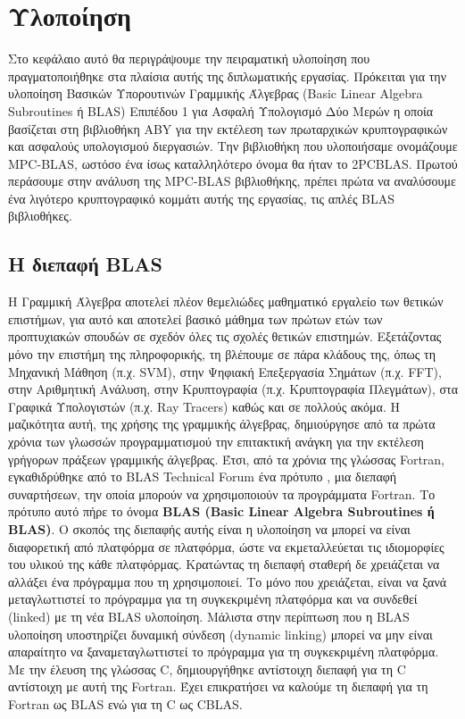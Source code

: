 \chapter{Υλοποίηση}
\label{chapter:implementation}

Στο κεφάλαιο αυτό θα περιγράψουμε την πειραματική υλοποίηση που πραγματοποιήθηκε στα πλαίσια αυτής της διπλωματικής εργασίας. Πρόκειται για την υλοποίηση Βασικών Υπορουτινών Γραμμικής Άλγεβρας (Basic Linear Algebra Subroutines ή BLAS) Επιπέδου 1 για Ασφαλή Υπολογισμό Δύο Μερών η οποία βασίζεται στη βιβλιοθήκη ABY για την εκτέλεση των πρωταρχικών κρυπτογραφικών και ασφαλούς υπολογισμού διεργασιών. Την βιβλιοθήκη που υλοποιήσαμε ονομάζουμε MPC-BLAS, ωστόσο ένα ίσως καταλληλότερο όνομα θα ήταν το 2PCBLAS. Πρωτού περάσουμε στην ανάλυση της MPC-BLAS βιβλιοθήκης, πρέπει πρώτα να αναλύσουμε ένα λιγότερο κρυπτογραφικό κομμάτι αυτής της εργασίας, τις απλές BLAS βιβλιοθήκες.


\section{Η διεπαφή BLAS}

Η Γραμμική Άλγεβρα αποτελεί πλέον θεμελιώδες μαθηματικό εργαλείο των θετικών επιστήμων, για αυτό και αποτελεί βασικό μάθημα των πρώτων ετών των προπτυχιακών σπουδών σε σχεδόν όλες τις σχολές θετικών επιστημών. Εξετάζοντας μόνο την επιστήμη της πληροφορικής, τη βλέπουμε σε πάρα κλάδους της, όπως τη Μηχανική Μάθηση (π.χ. SVM), στην Ψηφιακή Επεξεργασία Σημάτων (π.χ. FFT), στην Αριθμητική Ανάλυση, στην Κρυπτογραφία (π.χ. Κρυπτογραφία Πλεγμάτων), στα Γραφικά Υπολογιστών (π.χ. Ray Tracers) καθώς και σε πολλούς ακόμα.
Η μαζικότητα αυτή, της χρήσης της γραμμικής άλγεβρας, δημιούργησε από τα πρώτα χρόνια των γλωσσών προγραμματισμού την επιτακτική ανάγκη για την εκτέλεση γρήγορων πράξεων γραμμικής άλγεβρας. Έτσι, από τα χρόνια της γλώσσας Fortran, εγκαθιδρύθηκε από το BLAS Technical Forum ένα πρότυπο \cite{blackford2002updated}, μια διεπαφή συναρτήσεων, την οποία μπορούν να χρησιμοποιούν τα προγράμματα Fortran. Το πρότυπο αυτό πήρε το όνομα \textbf{BLAS (Basic Linear Algebra Subroutines ή BLAS)}. Ο σκοπός της διεπαφής αυτής είναι η υλοποίηση να μπορεί να είναι διαφορετική
από πλατφόρμα σε πλατφόρμα, ώστε να εκμεταλλεύεται τις ιδιομορφίες του υλικού της κάθε πλατφόρμας. Κρατώντας τη διεπαφή σταθερή δε χρειάζεται να αλλάξει ένα πρόγραμμα που τη χρησιμοποιεί. Το μόνο που χρειάζεται, είναι να ξανά μεταγλωττιστεί το πρόγραμμα για τη συγκεκριμένη πλατφόρμα και να συνδεθεί (linked) με τη νέα BLAS υλοποίηση. Μάλιστα στην περίπτωση που η BLAS υλοποίηση υποστηρίζει δυναμική σύνδεση (dynamic linking) μπορεί να μην είναι απαραίτητο να ξαναμεταγλωττιστεί το πρόγραμμα για τη συγκεκριμένη πλατφόρμα. Με την έλευση της γλώσσας C, δημιουργήθηκε αντίστοιχη διεπαφή για τη C αντίστοιχη με αυτή της Fortran. Έχει επικρατήσει να καλούμε τη διεπαφή για τη Fortran ως BLAS ενώ για τη C ως CBLAS.

